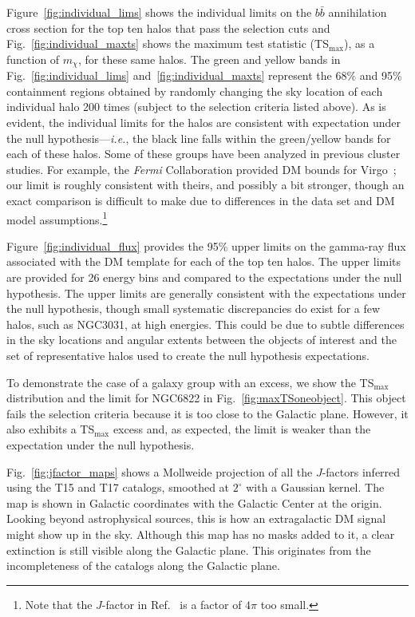 Figure~\ref{fig:individual_lims} shows the individual limits on the $b\bar{b}$ annihilation cross section for the top ten halos that pass the selection cuts and Fig.~\ref{fig:individual_maxts}  shows the maximum test statistic (TS$_\text{max}$), as a function of $m_\chi$, for these same halos. The green and yellow bands in Fig.~\ref{fig:individual_lims} and~\ref{fig:individual_maxts} represent the 68\% and 95\% containment regions obtained by randomly changing the sky location of each individual halo 200 times (subject to the selection criteria listed above). 
As is evident, the individual limits for the halos  are consistent with expectation under the null hypothesis---\emph{i.e.}, the black line falls within the green/yellow bands for each of these halos.  Some of these groups have been analyzed in previous cluster studies.  For example, the \emph{Fermi} Collaboration provided DM bounds for Virgo~\cite{Ackermann:2015fdi}; our limit is roughly consistent with theirs, and possibly a bit stronger, though an exact comparison is difficult to make due to differences in the data set and DM model assumptions.\footnote{Note that the $J$-factor in Ref.~\cite{Ackermann:2015fdi} is a factor of $4\pi$ too small.}

Figure~\ref{fig:individual_flux} provides the 95\% upper limits on the gamma-ray flux associated with the DM template for each of the top ten halos.  The upper limits are provided for 26 energy bins and compared to the expectations under the null hypothesis.  The upper limits are generally consistent with the expectations under the null hypothesis, though small systematic discrepancies do exist for a few halos, such as NGC3031, at high energies.  This could be due to subtle differences in the sky locations and angular extents between the objects of interest and the set of representative halos used to create the null hypothesis expectations. 

To demonstrate the case of a galaxy group with an excess, we show the TS$_\text{max}$ distribution and the limit for NGC6822 in Fig.~\ref{fig:maxTSoneobject}.  This object fails the selection criteria because it is too close to the Galactic plane. However, it also exhibits a TS$_\text{max}$ excess and, as expected, the limit is weaker than the expectation under the null hypothesis. \vspace{0.1in}

 Fig.~\ref{fig:jfactor_maps} shows a Mollweide projection of all the $J$-factors inferred using the T15 and T17 catalogs,  smoothed at $2^\circ$ with a Gaussian kernel. The map is shown in Galactic coordinates with the Galactic Center at the origin. Looking beyond astrophysical sources, this is how an extragalactic DM signal might show up in the sky. Although this map has no masks added to it, a clear extinction is still visible along the Galactic plane. This originates from the incompleteness of the catalogs along the Galactic plane. 

